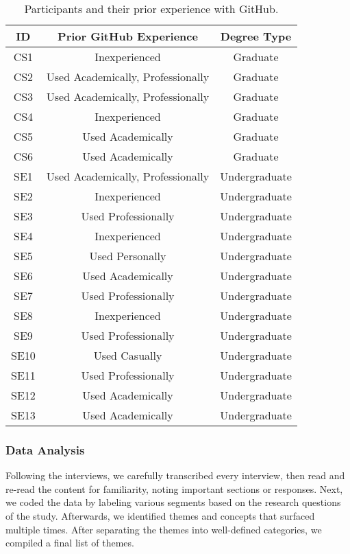 \begin{table}[h]
    \vspace{1pt}
        \caption{Participants and their prior experience with GitHub.}\label{table:interviews:students}
    \vspace{1pt}
    \begin{center}
        \begin{tabular}{c | c | c}
            \hline
            ID & Prior GitHub Experience & Degree Type \\
            \hline
            CS1 & Inexperienced & Graduate \\ \hline
            CS2 & Used Academically, Professionally & Graduate \\ \hline
            CS3 & Used Academically, Professionally & Graduate \\ \hline
            CS4 & Inexperienced & Graduate \\ \hline
            CS5 & Used Academically & Graduate \\ \hline
            CS6 & Used Academically & Graduate \\ \hline
            SE1 & Used Academically, Professionally & Undergraduate \\ \hline
            SE2 & Inexperienced & Undergraduate \\ \hline
            SE3 & Used Professionally & Undergraduate \\ \hline
            SE4 & Inexperienced & Undergraduate \\ \hline
            SE5 & Used Personally & Undergraduate \\ \hline
            SE6 & Used Academically & Undergraduate \\ \hline
            SE7 & Used Professionally & Undergraduate \\ \hline
            SE8 & Inexperienced & Undergraduate \\ \hline
            SE9 & Used Professionally & Undergraduate \\ \hline
            SE10 & Used Casually & Undergraduate \\ \hline
            SE11 & Used Professionally & Undergraduate \\ \hline
            SE12 & Used Academically & Undergraduate \\ \hline
            SE13 & Used Academically & Undergraduate \\ \hline
        \end{tabular}
    \end{center}
\end{table}

\subsubsection{Data Analysis}
Following the interviews, we carefully transcribed every interview, then read and re-read the content for familiarity, noting important sections or responses. Next, we coded the data by labeling various segments based on the research questions of the study. Afterwards, we identified themes and concepts that surfaced multiple times. After separating the themes into well-defined categories, we compiled a final list of themes.
